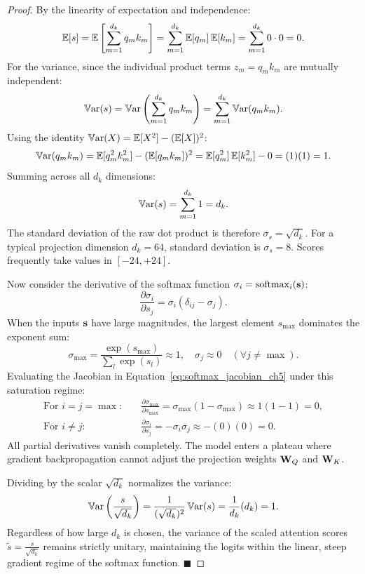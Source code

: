 \documentclass[../../../main.tex]{subfiles}
\begin{document}
\begin{proof}
By the linearity of expectation and independence:
\begin{equation}
\operatorname*{\mathbb{E}}[s] = \operatorname*{\mathbb{E}}\left[ \sum_{m=1}^{d_k} q_m k_m \right] = \sum_{m=1}^{d_k} \operatorname*{\mathbb{E}}[q_m] \operatorname*{\mathbb{E}}[k_m] = \sum_{m=1}^{d_k} 0 \cdot 0 = 0.
\end{equation}
For the variance, since the individual product terms $z_m = q_m k_m$ are mutually independent:
\begin{equation}
\operatorname{\mathbb{V}\mathrm{ar}}(s) = \operatorname{\mathbb{V}\mathrm{ar}}\left( \sum_{m=1}^{d_k} q_m k_m \right) = \sum_{m=1}^{d_k} \operatorname{\mathbb{V}\mathrm{ar}}(q_m k_m).
\end{equation}
Using the identity $\operatorname{\mathbb{V}\mathrm{ar}}(X) = \operatorname*{\mathbb{E}}[X^2] - (\operatorname*{\mathbb{E}}[X])^2$:
\begin{equation}
\operatorname{\mathbb{V}\mathrm{ar}}(q_m k_m) = \operatorname*{\mathbb{E}}[q_m^2 k_m^2] - (\operatorname*{\mathbb{E}}[q_m k_m])^2 = \operatorname*{\mathbb{E}}[q_m^2] \operatorname*{\mathbb{E}}[k_m^2] - 0 = (1)(1) = 1.
\end{equation}
Summing across all $d_k$ dimensions:
\begin{equation}
\operatorname{\mathbb{V}\mathrm{ar}}(s) = \sum_{m=1}^{d_k} 1 = d_k.
\end{equation}
The standard deviation of the raw dot product is therefore $\sigma_s = \sqrt{d_k}$. For a typical projection dimension $d_k = 64$, standard deviation is $\sigma_s = 8$. Scores frequently take values in $[-24, +24]$.

Now consider the derivative of the softmax function $\sigma_i = \operatorname{\mathrm{softmax}}_i(\mathbf{s})$:
\begin{equation}
\label{eq:softmax_jacobian_ch5}
\frac{\partial \sigma_i}{\partial s_j} = \sigma_i (\delta_{ij} - \sigma_j).
\end{equation}
When the inputs $\mathbf{s}$ have large magnitudes, the largest element $s_{\max}$ dominates the exponent sum:
\begin{equation}
\sigma_{\max} = \frac{\exp(s_{\max})}{\sum_l \exp(s_l)} \approx 1, \quad \sigma_{j} \approx 0 \quad (\forall j \neq \max).
\end{equation}
Evaluating the Jacobian in Equation~\eqref{eq:softmax_jacobian_ch5} under this saturation regime:
\begin{align}
\text{For } i = j = \max: \quad &\frac{\partial \sigma_{\max}}{\partial s_{\max}} = \sigma_{\max}(1 - \sigma_{\max}) \approx 1(1 - 1) = 0, \\
\text{For } i \neq j: \quad &\frac{\partial \sigma_i}{\partial s_j} = -\sigma_i \sigma_j \approx -(0)(0) = 0.
\end{align}
All partial derivatives vanish completely. The model enters a plateau where gradient backpropagation cannot adjust the projection weights $\mathbf{W}_Q$ and $\mathbf{W}_K$.

Dividing by the scalar $\sqrt{d_k}$ normalizes the variance:
\begin{equation}
\operatorname{\mathbb{V}\mathrm{ar}}\left( \frac{s}{\sqrt{d_k}} \right) = \frac{1}{(\sqrt{d_k})^2} \operatorname{\mathbb{V}\mathrm{ar}}(s) = \frac{1}{d_k} (d_k) = 1.
\end{equation}
Regardless of how large $d_k$ is chosen, the variance of the scaled attention scores $\tilde{s} = \frac{s}{\sqrt{d_k}}$ remains strictly unitary, maintaining the logits within the linear, steep gradient regime of the softmax function. $\blacksquare$
\end{proof}
\end{document}
